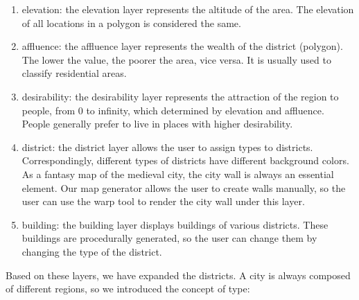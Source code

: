 \begin{enumerate}
  \item elevation: the elevation layer represents the altitude of the area. The elevation of all locations in a polygon is considered the same.
  \item affluence: the affluence layer represents the wealth of the district (polygon). The lower the value, the poorer the area, vice versa. It is usually used to classify residential areas.
  \item desirability: the desirability layer represents the attraction of the region to people, from 0 to infinity, which determined by elevation and affluence. People generally prefer to live in places with higher desirability.
  \item district: the district layer allows the user to assign types to districts. Correspondingly, different types of districts have different background colors. As a fantasy map of the medieval city, the city wall is always an essential element. Our map generator allows the user to create walls manually, so the user can use the warp tool to render the city wall under this layer.
  \item building: the building layer displays buildings of various districts. These buildings are procedurally generated, so the user can change them by changing the type of the district.
\end{enumerate}

Based on these layers, we have expanded the districts. A city is always composed of different regions, so we introduced the concept of type:

